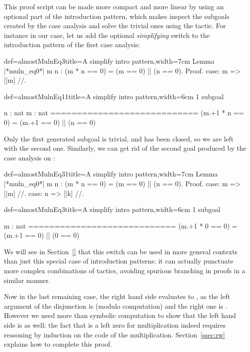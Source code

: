 This proof script can be made more compact and more linear by using an
optional part of the introduction pattern, which makes \Coq{}
inspect the subgoals created by the case analysis and solve the
trivial ones using the  tactic. For instance in our case,
let us add the optional \C{//} \emph{simplifying} switch to the
introduction pattern of the first case analysis:

\begin{coq}{def=almostMulnEq3}{title=A simplify intro pattern,width=7cm}
Lemma |*muln_eq0*| m n :
  (m * n == 0) = (m == 0) || (n == 0).
Proof.
case: m => [|m] //.
\end{coq}
\begin{coqout}{def=almostMulnEq11}{title=A simplify intro pattern,width=6cm}
1 subgoal

n : nat
m : nat
============================
(m.+1 * n == 0) =
(m.+1 == 0) || (n == 0)
\end{coqout}

Only the first generated subgoal is trivial, and has been closed, so
we are left with the second one. Similarly, we can get rid of the
second goal produced by the case analysis on :

\begin{coq}{def=almostMulnEq31}{title=A simplify intro pattern,width=7cm}
Lemma |*muln_eq0*| m n :
  (m * n == 0) = (m == 0) || (n == 0).
Proof.
case: m => [|m] //.
case: n => [|k] //.
\end{coq}
\begin{coqout}{def=almostMulnEq3}{title=A simplify intro pattern,width=6cm}
1 subgoal

m : nat
============================
(m.+1 * 0 == 0) =
(m.+1 == 0) || (0 == 0)
\end{coqout}

We will see in Section~\ref{} that this \C{//} switch can be used in
more general contexts than just this special case of introduction patterns:
it can actually punctuate more complex combinations of tactics,
avoiding spurious branching in proofs in a similar manner.

Now in the last remaining case, the right hand side evaluates to
, as the left argument of the disjunction is  (modulo
computation) and the right one is . However we need
more than symbolic computation to show that the left hand side is
 as well: the fact that  is a left zero for
multiplication indeed requires reasoning by induction on the code of the
multiplication. Section~\ref{ssec:rw} explains how to complete this
proof.


